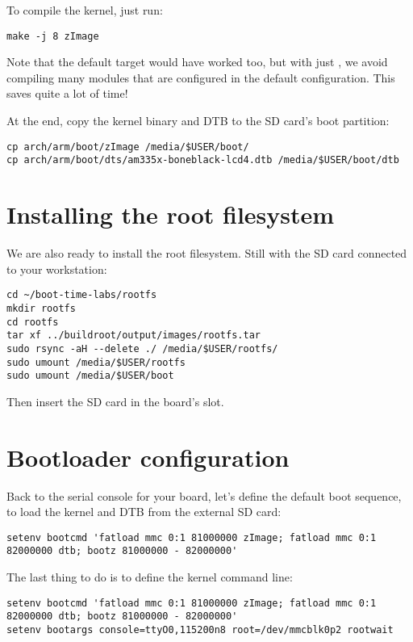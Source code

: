 To compile the kernel, just run:
\begin{verbatim}
make -j 8 zImage
\end{verbatim}

Note that the default  target would have worked too, but with
just , we avoid compiling many modules that are configured
in the default configuration. This saves quite a lot of time!

At the end, copy the kernel binary and DTB to the SD card's boot
partition:

\begin{verbatim}
cp arch/arm/boot/zImage /media/$USER/boot/
cp arch/arm/boot/dts/am335x-boneblack-lcd4.dtb /media/$USER/boot/dtb
\end{verbatim}

\section{Installing the root filesystem}

We are also ready to install the root filesystem. Still with the SD card
connected to your workstation:

\begin{verbatim}
cd ~/boot-time-labs/rootfs
mkdir rootfs
cd rootfs
tar xf ../buildroot/output/images/rootfs.tar
sudo rsync -aH --delete ./ /media/$USER/rootfs/
sudo umount /media/$USER/rootfs
sudo umount /media/$USER/boot
\end{verbatim}

Then insert the SD card in the board's slot.

\section{Bootloader configuration}

Back to the serial console for your board, let's define the default boot
sequence, to load the kernel and DTB from the external SD card:

\begin{verbatim}
setenv bootcmd 'fatload mmc 0:1 81000000 zImage; fatload mmc 0:1 82000000 dtb; bootz 81000000 - 82000000'
\end{verbatim}

The last thing to do is to define the kernel command line:
\begin{verbatim}
setenv bootcmd 'fatload mmc 0:1 81000000 zImage; fatload mmc 0:1 82000000 dtb; bootz 81000000 - 82000000'
setenv bootargs console=ttyO0,115200n8 root=/dev/mmcblk0p2 rootwait
\end{verbatim}

